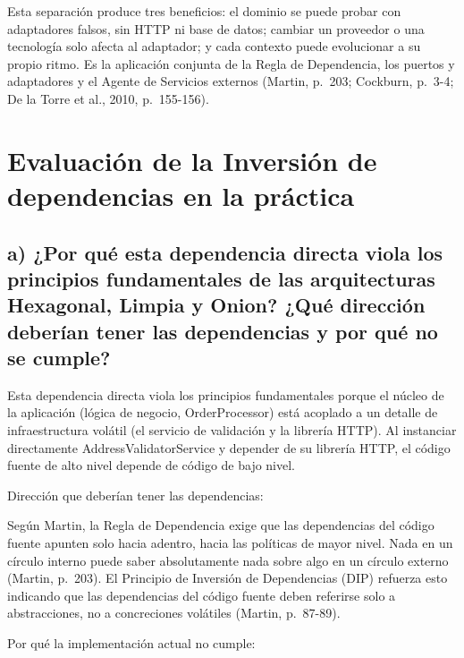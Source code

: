\documentclass[12pt,a4paper]{article}
\begin{document}
Esta separación produce tres beneficios: el dominio se puede probar con adaptadores falsos, sin HTTP ni base de datos; cambiar un proveedor o una tecnología solo afecta al adaptador; y cada contexto puede evolucionar a su propio ritmo. Es la aplicación conjunta de la Regla de Dependencia, los puertos y adaptadores y el Agente de Servicios externos (Martin, p.~203; Cockburn, p.~3-4; De la Torre et al., 2010, p.~155-156).

\section{Evaluación de la Inversión de dependencias en la práctica}

\subsection{a) ¿Por qué esta dependencia directa viola los principios fundamentales de las arquitecturas Hexagonal, Limpia y Onion? ¿Qué dirección deberían tener las dependencias y por qué no se cumple?}

Esta dependencia directa viola los principios fundamentales porque el núcleo de la aplicación (lógica de negocio, OrderProcessor) está acoplado a un detalle de infraestructura volátil (el servicio de validación y la librería HTTP). Al instanciar directamente AddressValidatorService y depender de su librería HTTP, el código fuente de alto nivel depende de código de bajo nivel.

Dirección que deberían tener las dependencias:

Según Martin, la Regla de Dependencia exige que las dependencias del código fuente apunten solo hacia adentro, hacia las políticas de mayor nivel. Nada en un círculo interno puede saber absolutamente nada sobre algo en un círculo externo (Martin, p.~203). El Principio de Inversión de Dependencias (DIP) refuerza esto indicando que las dependencias del código fuente deben referirse solo a abstracciones, no a concreciones volátiles (Martin, p.~87-89).

Por qué la implementación actual no cumple:
\end{document}
